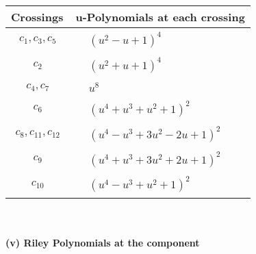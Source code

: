\documentclass[1p]{elsarticle_modified}
\theoremstyle{definition}
\begin{document}
\begin{tabular}{m{50pt}|m{274pt}}
Crossings & \hspace{64pt}u-Polynomials at each crossing \\
\hline $$\begin{aligned}c_{1},c_{3},c_{5}\end{aligned}$$&$\begin{aligned}
&(u^2- u+1)^4
\end{aligned}$\\
\hline $$\begin{aligned}c_{2}\end{aligned}$$&$\begin{aligned}
&(u^2+u+1)^4
\end{aligned}$\\
\hline $$\begin{aligned}c_{4},c_{7}\end{aligned}$$&$\begin{aligned}
&u^8
\end{aligned}$\\
\hline $$\begin{aligned}c_{6}\end{aligned}$$&$\begin{aligned}
&(u^4+u^3+u^2+1)^2
\end{aligned}$\\
\hline $$\begin{aligned}c_{8},c_{11},c_{12}\end{aligned}$$&$\begin{aligned}
&(u^4- u^3+3 u^2-2 u+1)^2
\end{aligned}$\\
\hline $$\begin{aligned}c_{9}\end{aligned}$$&$\begin{aligned}
&(u^4+u^3+3 u^2+2 u+1)^2
\end{aligned}$\\
\hline $$\begin{aligned}c_{10}\end{aligned}$$&$\begin{aligned}
&(u^4- u^3+u^2+1)^2
\end{aligned}$\\
\hline
\end{tabular}\\~\\
\newpage\renewcommand{\arraystretch}{1}
\flushleft \textbf{(v) Riley Polynomials at the component}\newline \\
\end{document}
